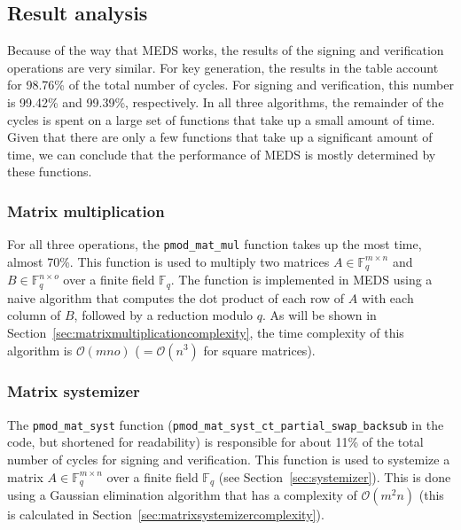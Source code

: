 \documentclass[11pt,a4paper]{report}
\theoremstyle{definition}
\begin{document}

\subsection{Result analysis}
Because of the way that MEDS works, the results of the signing and verification operations are very similar. For key generation, the results in the table account for 98.76\% of the total number of cycles. For signing and verification, this number is 99.42\% and 99.39\%, respectively. In all three algorithms, the remainder of the cycles is spent on a large set of functions that take up a small amount of time. Given that there are only a few functions that take up a significant amount of time, we can conclude that the performance of MEDS is mostly determined by these functions.

\subsubsection{Matrix multiplication}
For all three operations, the \texttt{pmod\_mat\_mul} function takes up the most time, almost 70\%. This function is used to multiply two matrices $A \in \mathbb{F}_q^{m \times n}$ and $B \in \mathbb{F}_q^{n \times o}$ over a finite field $\mathbb{F}_q$. The function is implemented in MEDS using a naive algorithm that computes the dot product of each row of $A$ with each column of $B$, followed by a reduction modulo $q$. As will be shown in Section~\ref{sec:matrixmultiplicationcomplexity}, the time complexity of this algorithm is $\mathcal{O}(mno)$ ($= \mathcal{O}(n^3)$ for square matrices).

\subsubsection{Matrix systemizer}
The \texttt{pmod\_mat\_syst} function (\texttt{pmod\_mat\_syst\_ct\_partial\_swap\_backsub} in the code, but shortened for readability) is responsible for about 11\% of the total number of cycles for signing and verification. This function is used to systemize a matrix $A \in \mathbb{F}_q^{m \times n}$ over a finite field $\mathbb{F}_q$ (see Section~\ref{sec:systemizer}). This is done using a Gaussian elimination algorithm that has a complexity of $\mathcal{O}(m^2n)$ (this is calculated in Section~\ref{sec:matrixsystemizercomplexity}).
\end{document}
